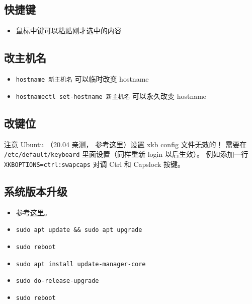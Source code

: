 
\subsection{快捷键}
\begin{itemize}
\item 鼠标中键可以粘贴刚才选中的内容
\end{itemize}


\subsection{改主机名}
\begin{itemize}
\item \verb|hostname 新主机名| 可以临时改变 hostname
\item \verb|hostnamectl set-hostname 新主机名| 可以永久改变 hostname
\end{itemize}


\subsection{改键位}
注意 Ubuntu （20.04 亲测， 参考\href{https://manpages.ubuntu.com/manpages/focal/en/man5/keyboard.5.html}{这里}）设置 xkb config 文件无效的！ 需要在 \verb|/etc/default/keyboard| 里面设置（同样重新 login 以后生效）。 例如添加一行 \verb|XKBOPTIONS=ctrl:swapcaps| 对调 Ctrl 和 Capslock 按键。

\subsection{系统版本升级}
\begin{itemize}
\item 参考\href{https://www.cyberciti.biz/faq/upgrade-ubuntu-18-04-to-20-04-lts-using-command-line/#Make_a_backup}{这里}。
\item \verb|sudo apt update && sudo apt upgrade|
\item \verb|sudo reboot|
\item \verb|sudo apt install update-manager-core|
\item \verb|sudo do-release-upgrade|
\item \verb|sudo reboot|
\end{itemize}

